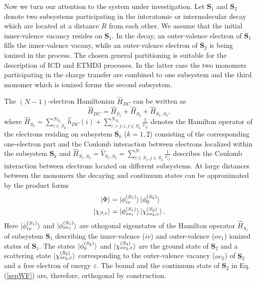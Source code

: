 Now we turn our attention to the system under investigation.
Let $\mathbf{S}_1$ and $\mathbf{S}_2$ denote two subsystems participating in the
interatomic or intermolecular decay which are located at a distance $R$ from each
other. We assume that the initial inner-valence vacancy resides on $\mathbf{S}_1$.
In the decay, an outer-valence electron of $\mathbf{S}_1$ fills the inner-valence
vacany, while an outer-valence electron of $\mathbf{S}_2$ is being ionized in the
process. The chosen general partitioning is suitable for the description of ICD
and ETMD3 processes. In the latter case the two monomers participating in the
charge transfer are combined to one subsystem and the third monomer which is ionized
forms the second subsystem. 

The $(N-1)$-electron Hamiltonian $\hat{H}_{DC}$ can be written as
\begin{equation}\label{sepHDC}
 \hat{H}_{DC} = \hat{H}_{S_1} + \hat{H}_{S_2} + \hat{H}_{S_1,S_2},
\end{equation}
where $\hat{H}_{S_k} = \sum\limits_{i\in S_k}^{N_{S_k}} \hat{h}_{DC}(i)
                       + \sum\limits_{i>j; i,j\in S_k}^{N_{S_k}} \frac{1}{r_{ij}}$
denotes the Hamilton operator of the electrons residing on subsystem
$\mathbf{S}_k$ ($k=1,2$) consisting of the corresponding one-electron part and
the Coulomb interaction between electrons localized within the
subsystem $\mathbf{S}_k$ and
$\hat{H}_{S_1,S_2} = \hat{V}_{S_1,S_2} = \sum\limits_{i\in S_1, j\in S_2}^N \frac{1}{r_{ij}}$
describes the Coulomb interaction between electrons located on different subsystems.
At large distances between the monomers the decaying and continuum states can be
approximated by the product forms 
\begin{align}\label{sepWF}
 \ket{\Phi}                       &= \ket{\phi_{iv}^{(S_1)}}   \ket{\phi_{0}^{(S_2)}} \nonumber\\
 \ket{\chi_{\beta,\varepsilon}} &= \ket{\phi_{ov_1}^{(S_1)}} \ket{\chi_{ov_2,\varepsilon}^{(S_2)}}.
\end{align}
Here $\ket{\phi_{iv}^{(S_1)}}$ and $\ket{\phi_{ov_1}^{(S_1)}}$ are othogonal
eigenstates of the Hamilton operator $\hat{H}_{S_1}$ of subsystem $\mathbf{S}_1$
describing the inner-valence ($iv$) and outer-valence ($ov_1$) ionized states of
$\mathbf{S}_1$. The states $\ket{\phi_{0}^{(S_2)}}$ and $\ket{\chi_{ov_2,\varepsilon}^{(S_2)}}$
are the ground state of $\mathbf{S}_2$ and a scattering state
$\ket{\chi_{ov_2,\varepsilon}^{(S_2)}}$ corresponding to the outer-valence vacancy ($ov_2$)
of $\mathbf{S}_2$ and a free electron of energy $\varepsilon$. The bound and the continuum
state of $\mathbf{S}_2$ in Eq. (\ref{sepWF}) are, therefore, orthogonal by construction.

